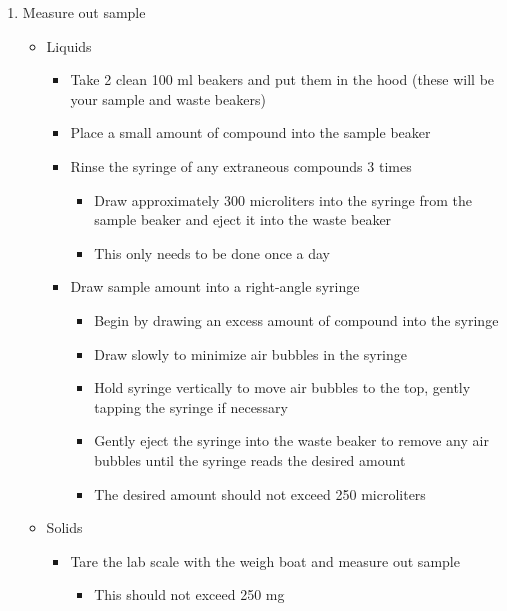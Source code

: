 \documentclass[letterpaper,11pt]{article}
\begin{document}
    \begin{enumerate}
    
    \item Measure out sample
        \begin{itemize}
        \item Liquids
            \begin{itemize}
            \item Take 2 clean 100 ml beakers and put them in the hood (these will be your sample
                    and waste beakers)
            \item Place a small amount of compound into the sample beaker
            \item Rinse the syringe of any extraneous compounds 3 times
                \begin{itemize}
                \item Draw approximately 300 microliters into the syringe from 
                    the sample beaker and
                    eject it into the waste beaker
                \item This only needs to be done once a day
                \end{itemize}
            \item Draw sample amount into a right-angle syringe
                \begin{itemize}
                \item Begin by drawing an excess amount of compound into the syringe
                \item Draw slowly to minimize air bubbles in the syringe
                \item Hold syringe vertically to move air bubbles to the top, gently tapping the 
                    syringe if necessary
                \item Gently eject the syringe into the waste beaker to remove any air bubbles until
                    the syringe reads the desired amount
                \item The desired amount should not exceed 250 microliters
                \end{itemize}
            \end{itemize}

        
        \item Solids
            \begin{itemize}
            \item Tare the lab scale with the weigh boat and measure out sample
                \begin{itemize}
                \item This should not exceed 250 mg
                \end{itemize}
            \end{itemize}
            

\end{itemize}
\end{enumerate}
\end{document}
